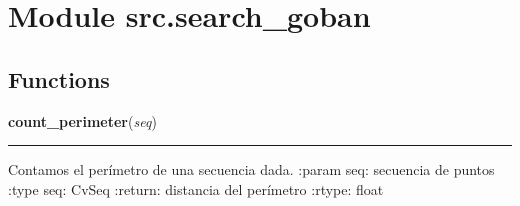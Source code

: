 %
%
%


\section{Module src.search\_goban}

    \label{src:search_goban}


  \subsection{Functions}

    \label{src:search_goban:count_perimeter}

    \vspace{0.5ex}

\hspace{.8\funcindent}\begin{boxedminipage}{\funcwidth}

    \raggedright \textbf{count\_perimeter}(\textit{seq})

    \vspace{-1.5ex}

    \rule{\textwidth}{0.5\fboxrule}
\setlength{\parskip}{2ex}
    Contamos el perímetro de una secuencia dada. :param seq: secuencia de 
    puntos :type seq: CvSeq :return: distancia del perímetro :rtype: float

\setlength{\parskip}{1ex}
    \end{boxedminipage}

    \label{src:search_goban:get_corners}

    \vspace{0.5ex}

